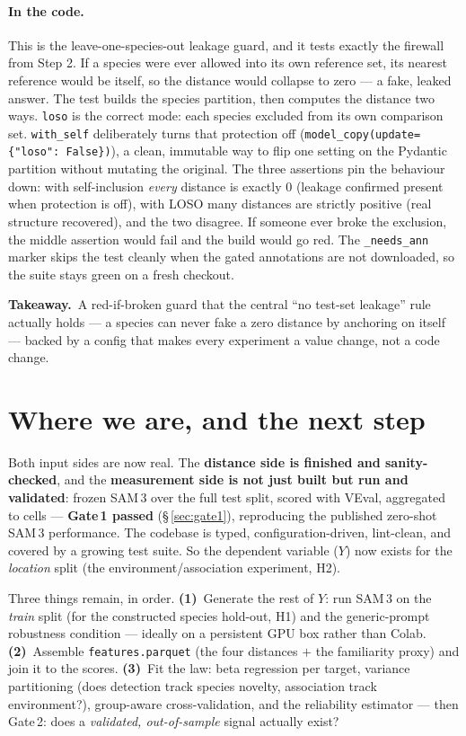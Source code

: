 \documentclass[11pt,a4paper]{article}
\newcommand{\code}[1]{\texttt{#1}}
\newcommand{\takeaway}[1]{\smallskip\noindent%
  \colorbox{forest!8}{\parbox{\dimexpr\linewidth-2\fboxsep\relax}{%
  \small{\color{forest}\textbf{Takeaway.}}\ #1}}\smallskip}
\begin{document}
\paragraph{In the code.}
This is the leave-one-species-out leakage guard, and it tests exactly the firewall from Step 2. If a species
were ever allowed into its own reference set, its nearest reference would be itself, so the distance would
collapse to zero --- a fake, leaked answer. The test builds the species partition, then computes the
distance two ways. \code{loso} is the correct mode: each species excluded from its own comparison set.
\code{with\_self} deliberately turns that protection off (\code{model\_copy(update=\{"loso": False\})}), a
clean, immutable way to flip one setting on the Pydantic partition without mutating the original. The three
assertions pin the behaviour down: with self-inclusion \emph{every} distance is exactly $0$ (leakage
confirmed present when protection is off), with LOSO many distances are strictly positive (real structure
recovered), and the two disagree. If someone ever broke the exclusion, the middle assertion would fail and
the build would go red. The \code{\_needs\_ann} marker skips the test cleanly when the gated annotations are
not downloaded, so the suite stays green on a fresh checkout.

\takeaway{A red-if-broken guard that the central ``no test-set leakage'' rule actually holds --- a species
can never fake a zero distance by anchoring on itself --- backed by a config that makes every experiment a
value change, not a code change.}

\section{Where we are, and the next step}
Both input sides are now real. The \textbf{distance side is finished and sanity-checked}, and the
\textbf{measurement side is not just built but run and validated}: frozen SAM\,3 over the full test split,
scored with VEval, aggregated to cells --- \textbf{Gate\,1 passed} (\S\,\ref{sec:gate1}), reproducing the
published zero-shot SAM\,3 performance. The codebase is typed, configuration-driven, lint-clean, and covered
by a growing test suite. So the dependent variable ($Y$) now exists for the \emph{location} split (the
environment/association experiment, H2).

Three things remain, in order. \textbf{(1)}~Generate the rest of $Y$: run SAM\,3 on the \emph{train} split
(for the constructed species hold-out, H1) and the generic-prompt robustness condition --- ideally on a
persistent GPU box rather than Colab. \textbf{(2)}~Assemble \code{features.parquet} (the four distances $+$
the familiarity proxy) and join it to the scores. \textbf{(3)}~Fit the law: beta regression per target,
variance partitioning (does detection track species novelty, association track environment?), group-aware
cross-validation, and the reliability estimator --- then Gate\,2: does a \emph{validated, out-of-sample}
signal actually exist?
\end{document}
